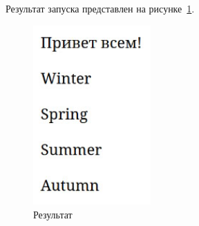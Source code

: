 \documentclass[a4paper, 14pt]{extarticle}
\begin{document}
Результат запуска представлен на рисунке~\ref{fig:img1}.

\begin{figure}[!htb]
	\centering
	\includegraphics[width=0.4\textwidth]{img1}
\caption{Результат}
\label{fig:img1}
\end{figure}
\end{document}
